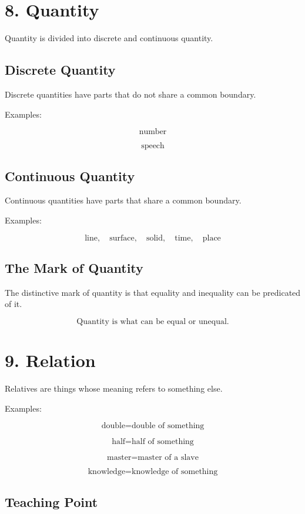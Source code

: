 \documentclass[12pt]{article}
\begin{document}
\section*{8. Quantity}

Quantity is divided into discrete and continuous quantity.

\subsection*{Discrete Quantity}

Discrete quantities have parts that do not share a common boundary.

Examples:

\[
\text{number}
\]

\[
\text{speech}
\]

\subsection*{Continuous Quantity}

Continuous quantities have parts that share a common boundary.

Examples:

\[
\text{line}, \quad \text{surface}, \quad \text{solid}, \quad \text{time}, \quad \text{place}
\]

\subsection*{The Mark of Quantity}

The distinctive mark of quantity is that equality and inequality can be
predicated of it.

\[
\boxed{
\text{Quantity is what can be equal or unequal.}
}
\]

\section*{9. Relation}

Relatives are things whose meaning refers to something else.

Examples:

\[
\text{double} = \text{double of something}
\]

\[
\text{half} = \text{half of something}
\]

\[
\text{master} = \text{master of a slave}
\]

\[
\text{knowledge} = \text{knowledge of something}
\]

\subsection*{Teaching Point}
\end{document}
